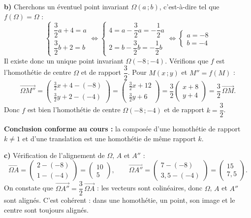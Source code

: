 \documentclass[11pt]{article}
\newcommand{\cle}[1]{{\popxbold\color{popdark}#1}}
\begin{document}
\begin{exoresolu}
\textbf{b)} Cherchons un éventuel point invariant $\Omega(a\,;b)$, c'est-à-dire tel que $f(\Omega)=\Omega$ :
\[
\begin{cases}
\dfrac{3}{2}a + 4 = a \\[4pt]
\dfrac{3}{2}b + 2 = b
\end{cases}
\Longleftrightarrow
\begin{cases}
4 = a - \dfrac{3}{2}a = -\dfrac{1}{2}a \\[4pt]
2 = b - \dfrac{3}{2}b = -\dfrac{1}{2}b
\end{cases}
\Longleftrightarrow
\begin{cases}
a = -8 \\
b = -4
\end{cases}
\]
Il existe donc un unique point invariant $\Omega(-8\,;-4)$. Vérifions que $f$ est l'homothétie de centre $\Omega$ et de rapport $\dfrac{3}{2}$. Pour $M(x\,;y)$ et $M'' = f(M)$ :
\[
\overrightarrow{\Omega M''} = \begin{pmatrix} \tfrac{3}{2}x + 4 - (-8) \\[2pt] \tfrac{3}{2}y + 2 - (-4) \end{pmatrix}
= \begin{pmatrix} \tfrac{3}{2}x + 12 \\[2pt] \tfrac{3}{2}y + 6 \end{pmatrix}
= \dfrac{3}{2}\begin{pmatrix} x + 8 \\ y + 4 \end{pmatrix}
= \dfrac{3}{2}\,\overrightarrow{\Omega M}.
\]
Donc $f$ est bien l'\cle{homothétie} de centre $\Omega(-8\,;-4)$ et de rapport $k=\dfrac{3}{2}$.

\textbf{Conclusion conforme au cours :} la composée d'une homothétie de rapport $k \neq 1$ et d'une translation est une homothétie de même rapport $k$.

\textbf{c)} Vérification de l'alignement de $\Omega$, $A$ et $A''$ :
\[
\overrightarrow{\Omega A} = \begin{pmatrix} 2-(-8) \\ 1-(-4) \end{pmatrix} = \begin{pmatrix} 10 \\ 5 \end{pmatrix},
\qquad
\overrightarrow{\Omega A''} = \begin{pmatrix} 7-(-8) \\ 3{,}5-(-4) \end{pmatrix} = \begin{pmatrix} 15 \\ 7{,}5 \end{pmatrix}.
\]
On constate que $\overrightarrow{\Omega A''} = \dfrac{3}{2}\,\overrightarrow{\Omega A}$ : les vecteurs sont colinéaires, donc $\Omega$, $A$ et $A''$ sont alignés. C'est cohérent : dans une homothétie, un point, son image et le centre sont toujours alignés.


\end{exoresolu}
\end{document}
